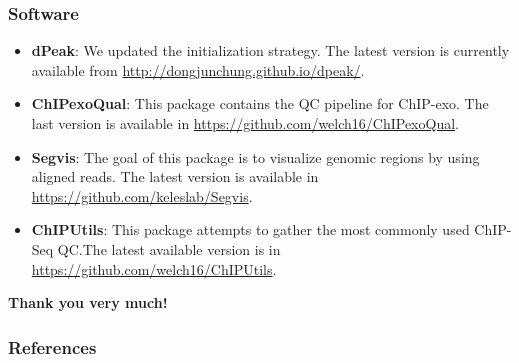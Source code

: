 \documentclass[compress,table,xcolor=dvipsnames]{beamer}\usepackage[]{graphicx}\usepackage[]{color}
\begin{document}
\begin{frame}[t]
\frametitle{Software}  
\begin{itemize}
\item {\color{RoyalBlue}\textbf{dPeak}}: We updated the initialization
  strategy. The latest version is currently available from
  \url{http://dongjunchung.github.io/dpeak/}.
\item {\color{RoyalBlue}\textbf{ChIPexoQual}}: This package contains
  the QC pipeline for ChIP-exo. The last version is available in
  \url{https://github.com/welch16/ChIPexoQual}.
\item {\color{RoyalBlue}\textbf{Segvis}}: The goal of this package is
  to visualize genomic regions by using aligned reads. The latest
  version is available in \url{https://github.com/keleslab/Segvis}.
\item {\color{RoyalBlue}\textbf{ChIPUtils}}: This package attempts to
  gather the most commonly used ChIP-Seq QC.The latest available
  version is in \url{https://github.com/welch16/ChIPUtils}.
\end{itemize}

\end{frame}

\begin{frame}[plain]
  
{\Huge
{\color{RoyalBlue}
\begin{center}
  \textbf{Thank you very much!}
\end{center}
}
}


\end{frame}


\begin{frame}[allowframebreaks]
  \frametitle{References}

{\tiny

\nocite{exo1}
\nocite{dpeak}



}

\end{frame}
\end{document}

